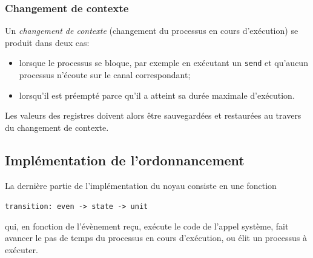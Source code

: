 \documentclass[french, toc]{../cs-classes/cs-classes}
\begin{document}
\subsubsection{Changement de contexte}
Un \emph{changement de contexte} (changement du processus en cours d'exécution) se produit dans deux cas:
\begin{itemize}
    \item lorsque le processus se bloque, par exemple en exécutant un \texttt{send} et qu'aucun processus n'écoute sur le canal correspondant;
    \item lorsqu'il est préempté parce qu'il a atteint sa durée maximale d'exécution.
\end{itemize}
Les valeurs des registres doivent alors être sauvegardées et restaurées au travers du changement de contexte.

\subsection{Implémentation de l'ordonnancement}
La dernière partie de l'implémentation du noyau consiste en une fonction
\begin{center}
    \texttt{transition: even -> state -> unit}
\end{center}
qui, en fonction de l'évènement reçu, exécute le code de l'appel système, fait avancer le pas de temps du processus en cours d'exécution, ou élit un processus à exécuter. 
\end{document}
